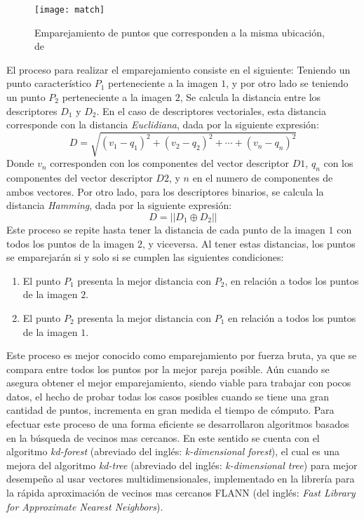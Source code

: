 \begin{figure}[H]
	\centering
	\texttt{[image: match]}
	\caption[Emparejamiento de puntos característicos]{Emparejamiento de puntos que corresponden a la misma ubicación, de \cite{comp-vision} }
	\label{imagen:match}
\end{figure}

El proceso para realizar el emparejamiento consiste en el siguiente: Teniendo un punto característico $P_{1}$ perteneciente a la imagen $1$, y por otro lado se teniendo un punto $P_{2}$ perteneciente a la imagen $2$, Se calcula la distancia entre los descriptores $D_{1}$ y $D_{2}$. En el caso de descriptores vectoriales, esta distancia corresponde con la distancia \textit{Euclidiana}, dada por la siguiente expresión:
\begin{displaymath}
D = \sqrt{ (v_{1}-q_{1})^2 + (v_{2}-q_{2})^2 + \cdots + (v_{n}-q_{n})^2 }
\end{displaymath}
Donde $v_{n}$ corresponden con los componentes del vector descriptor $D1$, $q_{n}$ con los componentes del vector descriptor $D2$, y $n$ en el numero de componentes de ambos vectores. Por otro lado, para los descriptores binarios, se calcula la distancia \textit{Hamming}, dada por la siguiente expresión:
\begin{displaymath}
D = ||D_{1} \oplus D_{2}||
\end{displaymath}
Este proceso se repite hasta tener la distancia de cada punto de la imagen $1$ con todos los puntos de la imagen $2$, y viceversa. Al tener estas distancias, los puntos se emparejarán si y solo si se cumplen las siguientes condiciones: 

\begin{enumerate}[label=(\roman*)]
	\item El punto $P_{1}$ presenta la mejor distancia con $P_{2}$, en relación a todos los puntos de la imagen $2$.
	
	\item El punto $P_{2}$ presenta la mejor distancia con $P_{1}$ en relación a todos los puntos de la imagen $1$.
\end{enumerate}

Este proceso es mejor conocido como emparejamiento por fuerza bruta, ya que se compara entre todos los puntos por la mejor pareja posible. Aún cuando se asegura obtener el mejor emparejamiento, siendo viable para trabajar con pocos datos, el hecho de probar todas los casos posibles cuando se tiene una gran cantidad de puntos, incrementa en gran medida el tiempo de cómputo. Para efectuar este proceso de una forma eficiente se desarrollaron algoritmos basados en la búsqueda de vecinos mas cercanos. En este sentido se cuenta con el algoritmo \textit{kd-forest} (abreviado del inglés: \textit{k-dimensional forest}), el cual es una mejora del algoritmo \textit{kd-tree} (abreviado del inglés: \textit{k-dimensional tree}) para mejor desempeño al usar vectores multidimensionales, implementado en la librería para la rápida aproximación de vecinos mas cercanos FLANN \cite{flann} (del inglés: \textit{Fast Library for Approximate Nearest Neighbors}).

